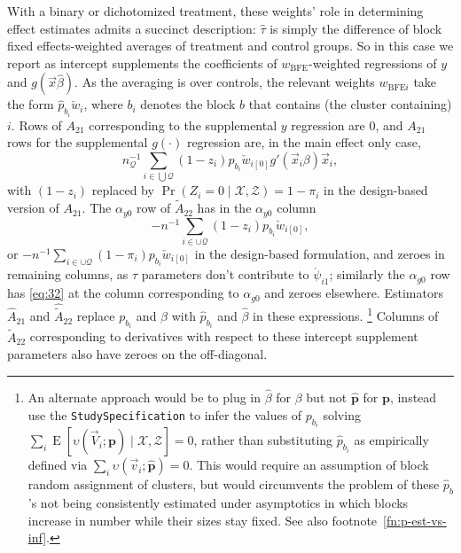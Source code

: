 \documentclass{article}
\newcommand{\EE}{\operatorname{E}}
\newcommand{\owt}[1][{[z_{i}]}]{\ensuremath{\check{w}_{i#1}}}
\newcommand{\absorbInterceptsEF}{\upsilon}
\begin{document}
With a binary or dichotomized treatment, these 
weights' role in determining effect estimates admits a
succinct description: $\hat{\tau}$ is simply the difference of block fixed
effects-weighted averages of treatment and control groups.  So in this
case we report as intercept supplements the coefficients of $w_{\text{BFE}}$-weighted
regressions of $y$ and $g(\vec{x}\hat\beta)$. As the
averaging is over controls, the relevant weights $w_{\text{BFE}i}$ take
the form $\hat{p}_{b_{i}} \owt[]$, where $b_{i}$ denotes the block $b$
that contains (the cluster containing) $i$.
Rows of $A_{21}$ corresponding to the supplemental $y$ regression are 0, and $A_{21}$ rows for the supplemental $g(\cdot)$ regression are, in the main effect only case, 
\begin{equation}\label{eq:11}
  n_{\mathcal{Q}}^{-1}\sum_{i\in \bigcup\mathcal{Q} }
  (1-z_{i}){p}_{b_{{i}}}\owt[{[0]}] g'(\vec{x}_{i}{\beta})
  \vec{x}_{i}, 
\end{equation}
with $(1-z_{i})$ replaced by $\operatorname{Pr}(Z_{i}=0 \mid \mathcal{X}, \mathcal{Z})
= 1-\pi_{i}$ in the design-based version of $A_{21}$. 
The $\alpha_{y0}$ row of $\tilde{A}_{22}$ has
in the $\alpha_{y0}$ column
\begin{equation}\label{eq:32}
  -n^{-1}\sum_{i \in \cup \mathcal{Q}}
(1-z_{i}){p}_{b_{{i}}}\owt[{[0]}],
\end{equation}
or $-n^{-1}\sum_{i \in \cup \mathcal{Q}}
(1-\pi_{i}){p}_{b_{{i}}}\owt[{[0]}]$ in the design-based formulation,
and zeroes in remaining columns, as $\tau$ parameters don't
contribute to $\acute{\psi}_{i1}$; similarly the $\alpha_{g0}$ row has \eqref{eq:32} at the column corresponding to $\alpha_{g0}$ and zeroes elsewhere. Estimators $\hat{A}_{21}$ and
$\hat{\tilde{A}}_{22}$ replace $p_{b_{i}}$ and $\beta$ with
$\hat{p}_{b_{i}}$ and $\hat{\beta}$ in these expressions.%
\footnote{An alternate approach would be to plug in $\hat\beta$ for
  $\beta$ but not $\hat{\mathbf{p}}$ for $\mathbf{p}$, instead use
the \texttt{StudySpecification} to infer the values of 
$p_{b_{i}}$ solving $\sum_{i} \EE [\absorbInterceptsEF(\vec{V}_{i};
\mathbf{p}) \mid \mathcal{X}, \mathcal{Z}]=0$, rather than substituting
$\hat{p}_{b_{i}}$ as empirically defined via  $\sum_{i} \absorbInterceptsEF(\vec{v}_{i};
\hat{\mathbf{p}})=0$.  This would require an assumption
of block random assignment of clusters, but would circumvents the problem
of these $\hat{p}_{b}$'s not being consistently estimated under
asymptotics in which blocks increase in number while their sizes stay
fixed. See also footnote~\ref{fn:p-est-vs-inf}.}
Columns of $\tilde{A}_{22}$ corresponding to derivatives with respect to these intercept supplement parameters also have zeroes on the off-diagonal. 
\end{document}
